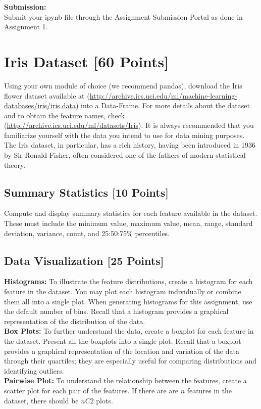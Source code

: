 \documentclass[letter-paper,12pt]{article} %
\begin{document}
\textbf{Submission:}\\
Submit your ipynb file through the Assignment Submission Portal as done in Assignment 1.

\section{Iris Dataset [60 Points]}
Using your own module of choice (we recommend pandas), download the Iris flower dataset available at (\url{http://archive.ics.uci.edu/ml/machine-learning-databases/iris/iris.data}) into a Data-Frame. For more details about the dataset and to obtain the feature names, check (\url{http://archive.ics.uci.edu/ml/datasets/Iris}). It is always recommended that you familiarize yourself with the data you intend to use for data mining purposes. The Iris dataset, in particular, has a rich history, having been introduced in 1936 by Sir Ronald Fisher, often considered one of the fathers of modern statistical theory.

\subsection{Summary Statistics [10 Points]}
Compute and display summary statistics for each feature available in the dataset. These must include the minimum value, maximum value, mean, range, standard deviation, variance, count, and 25:50:75\% percentiles.

\subsection{Data Visualization [25 Points]}
\textbf{Histograms:} To illustrate the feature distributions, create a histogram for each feature in the dataset. You may plot each histogram individually or combine them all into a single plot. When generating histograms for this assignment, use the default number of bins. Recall that a histogram provides a graphical representation of the distribution of the data.\\

\textbf{Box Plots:} To further understand the data, create a boxplot for each feature in the dataset.  Present all the boxplots into a single plot. Recall that a boxplot provides a graphical representation of the location and variation of the data through their quartiles; they are especially useful for comparing distributions and identifying outliers.\\

\textbf{Pairwise Plot:} To understand the relationship between the features, create a scatter plot for each pair of the features. If there are are $n$ features in the dataset, there should be $nC2$ plots.\\
\end{document}
